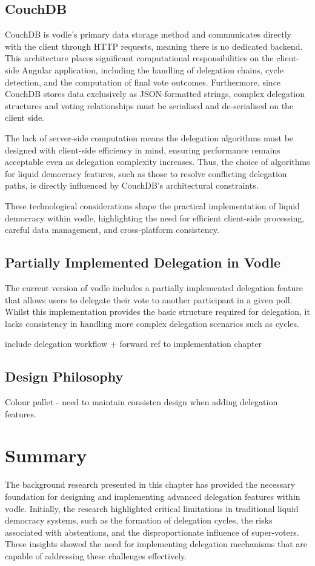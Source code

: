 \subsection*{CouchDB}
CouchDB \citep{couchdb} is vodle's primary data storage method and communicates directly with the client through HTTP requests, meaning there is no dedicated backend. This architecture places significant computational responsibilities on the client-side Angular application, including the handling of delegation chains, cycle detection, and the computation of final vote outcomes. Furthermore, since CouchDB stores data exclusively as JSON-formatted strings, complex delegation structures and voting relationships must be serialised and de-serialised on the client side.

The lack of server-side computation means the delegation algorithms must be designed with client-side efficiency in mind, ensuring performance remains acceptable even as delegation complexity increases. Thus, the choice of algorithms for liquid democracy features, such as those to resolve conflicting delegation paths, is directly influenced by CouchDB's architectural constraints.

These technological considerations shape the practical implementation of liquid democracy within vodle, highlighting the need for efficient client-side processing, careful data management, and cross-platform consistency.

\subsection{Partially Implemented Delegation in Vodle}

The current version of vodle includes a partially implemented delegation feature that allows users to delegate their vote to another participant in a given poll. Whilst this implementation provides the basic structure required for delegation, it lacks consistency in handling more complex delegation scenarios such as cycles.

include delegation workflow + forward ref to implementation chapter

\subsection{Design Philosophy}
Colour pallet - need to maintain consisten design when adding delegation features.


\section{Summary}
The background research presented in this chapter has provided the necessary foundation for designing and implementing advanced delegation features within vodle. Initially, the research highlighted critical limitations in traditional liquid democracy systems, such as the formation of delegation cycles, the risks associated with abstentions, and the disproportionate influence of super-voters. These insights showed the need for implementing delegation mechanisms that are capable of addressing these challenges effectively.

